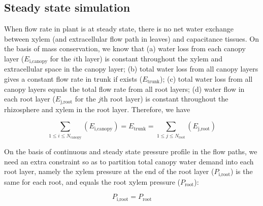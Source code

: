 \documentclass[twoside,10pt]{report}
\begin{document}
\subsection{Steady state simulation}
\par When flow rate in plant is at steady state, there is no net water exchange between xylem (and extracellular flow path in leaves) and capacitance tissues. On the basis of mass conservation, we know that (a) water loss from each canopy layer ($E_\text{i,canopy}$ for the $i$th layer) is constant throughout the xylem and extracellular space in the canopy layer; (b) total water loss from all canopy layers gives a constant flow rate in trunk if exists ($E_\text{trunk}$); (c) total water loss from all canopy layers equals the total flow rate from all root layers; (d) water flow in each root layer ($E_\text{j,root}$ for the $j$th root layer) is constant throughout the rhizosphere and xylem in the root layer. Therefore, we have

\begin{equation}
    \sum_{1 \leq i \leq N_\text{canopy}} \left( E_\text{i,canopy} \right) =
    E_\text{trunk} =
    \sum_{1 \leq j \leq N_\text{root}} \left( E_\text{j,root} \right)
    \label{eq:flow_conservation}
\end{equation}

\par \noindent On the basis of continuous and steady state pressure profile in the flow paths, we need an extra constraint so as to partition total canopy water demand into each root layer, namely the xylem pressure at the end of the root layer ($P_\text{i,root}$) is the same for each root, and equals the root xylem pressure ($P_\text{root}$):

\begin{equation}
    P_\text{i,root} = P_\text{root}
\end{equation}
\end{document}
